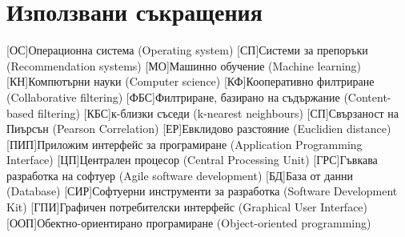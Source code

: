 \chapter{Използвани съкращения}
	\begin{acronym}
		[ОС]{Операционна система (Operating system)}
		[СП]{Системи за препоръки (Recommendation systems)}
		[МО]{Машинно обучение (Machine learning)}
		[КН]{Компютърни науки (Computer science)}
		[КФ]{Кооперативно филтриране (Collaborative filtering)}
		[ФБС]{Филтриране, базирано на съдържание (Content-based filtering)}
		[КБС]{к-близки съседи (k-nearest neighbours)}
		[СП]{Свързаност на Пиърсън (Pearson Correlation)}
		[ЕР]{Евклидово разстояние (Euclidien distance)}
		[ПИП]{Приложим интерфейс за програмиране (Application Programming Interface)}
		[ЦП]{Централен процесор (Central Processing Unit)}
		[ГРС]{Гъвкава разработка на софтуер (Agile software development)}
		[БД]{База от данни (Database)}
		[СИР]{Софтуерни инструменти за разработка (Software Development Kit)}
		[ГПИ]{Графичен потребителски интерфейс (Graphical User Interface)}
		[ООП]{Обектно-ориентирано програмиране (Object-oriented programming)}
	\end{acronym}
	

